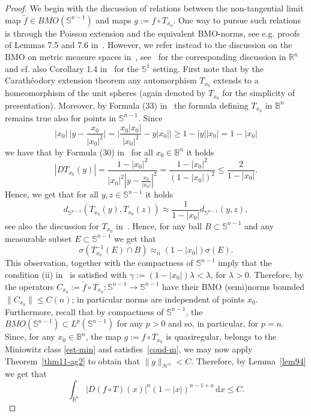 \documentclass[11pt,a4paper,reqno]{amsart}
\theoremstyle{definition}
\newcommand{\B}{\mathbb{B}^n}
\newcommand{\Rn}{{\mathbb R}^n}
\newcommand{\ud}{\mathrm {d}}
\newcommand{\Sn}{\mathbb{S}^{n-1}}
\numberwithin{komcounter}{section}
\begin{document}
\begin{proof} We begin with the discussion of relations between the non-tangential limit map $\tilde{f}\in BMO(\Sn)$ and maps $g:=f\circ T_{x_0}$. One way to pursue such relations is through the Poisson extension and the equivalent BMO-norms, see e.g. proofs of Lemmas 7.5 and 7.6 in~\cite{ak}. However, we refer instead to the discussion on the BMO on metric measure spaces in~\cite{kkms}, see~\cite{go} for the corresponding discussion in $\Rn$ and cf. also Corollary 1.4 in~\cite[Ch VI]{g} for the $\mathbb{S}^1$ setting. First note that by the Carath\'eodory extension theorem any automorphism $T_{x_0}$ extends to a homeomorphism of the unit spheres (again denoted by $T_{x_0}$ for the simplicity of presentation). Moreover, by Formula (33) in~\cite[Chapter 2]{ahl} the formula defining $T_{x_0}$ in $\B$ remains true also for points in $\Sn$. Since 
$$
|x_0|~\Big|y-\frac{x_0}{|x_0|^2}\Big|=\Big|\frac{x_0 |x_0|}{|x_0|^2}-y|x_0|\Big|\geq 1-|y||x_0|= 1-|x_0|
$$
we have that by Formula (30) in~\cite[Chapter 2]{ahl} for all $x_0\in \B$ it holds 
\[
 |DT_{x_0}(y)|=\frac{1-|x_0|^2}{|x_0|^2|y-\frac{x_0}{|x_0|}|^2}=\frac{1-|x_0|^2}{(1-|x_0|)^2}\leq \frac{2}{1-|x_0|}.
\]
Hence, we get that for all $y,z \in \Sn$ it holds 
\[
 d_{\Sn}(T_{x_0}(y),T_{x_0}(z))\approx \frac{1}{1-|x_0|} d_{\Sn}(y,z),
\]
see also the discussion for $T_{x_0}$ in~\cite[Section 2]{ak}. Hence, for any ball $B\subset \Sn$ and any measurable subset $E\subset \Sn$ we get that 
\[
\sigma(T_{x_0}^{-1}(E)\cap B)\approx_{n} (1-|x_0|) \sigma(E).
\]
This observation, together with the compactness of $\Sn$ imply that the condition (ii) in~\cite[Theorem 3.1]{kkms} is satisfied with $\gamma:=(1-|x_0|)\lambda<\lambda$, for $\lambda>0$. Therefore, by \cite[Proposition 3.8]{kkms} the operators $C_{x_0}:=\tilde{f}\circ T_{x_0}:\Sn\to \Sn$ have their BMO (semi)norms bounded $\|C_{x_0}\|\leq C(n)$; in particular norms are independent of points $x_0$. 
Furthermore, recall that by compactness of $\Sn$, the $BMO(\Sn)\subset L^p(\Sn)$ for any $p>0$ and so, in particular, for $p=n$. Since, for any $x_0\in \B$, the map $g:=f\circ T_{x_0}$ is quasiregular, belongs to the Miniowitz class \eqref{est-min} and satisfies~\eqref{cond-m}, we may now apply Theorem~\ref{thm11-ag2} to obtain that  $\|g\|_{\mathcal{H}^n}<C$. Therefore, by Lemma~\ref{lem94} we get that
\begin{equation}\label{eq1-lem75}
\int_{\B} |D(f\circ T)(x)|^{n}(1-|x|)^{n-1+a}\,\ud x \leq C.
\end{equation}


\end{proof}
\end{document}
